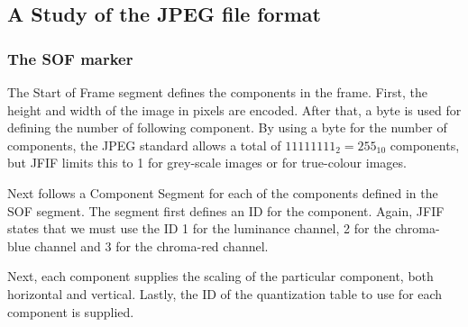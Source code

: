 \begin{infobox}{\section[A Study of the JPEG file format]{A Study of the JPEG file format}}
\subsubsection*{The SOF marker}
\begin{centering}
\end{centering}

The Start of Frame segment defines the components in the frame. First, the height and width of the image in pixels are encoded. After that, a byte is used for defining the number of following component. By using a byte for the number of components, the JPEG standard allows a total of $11111111_2=255_{10}$ components, but JFIF limits this to 1 for grey-scale images or for true-colour images.

Next follows a Component Segment for each of the components defined in the SOF segment. The segment first defines an ID for the component. Again, JFIF states that we must use the ID 1 for the luminance channel, 2 for the chroma-blue channel and 3 for the chroma-red channel.

Next, each component supplies the scaling of the particular component, both horizontal and vertical. Lastly, the ID of the quantization table to use for each component is supplied. 

\begin{centering}
\end{centering}


\end{infobox}
